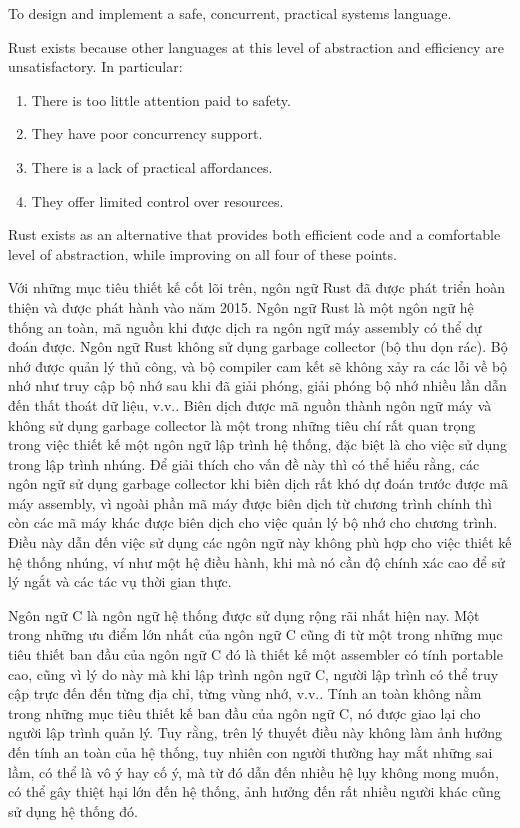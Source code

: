 To design and implement a safe, concurrent, practical systems language.

Rust exists because other languages at this level of abstraction and efficiency are unsatisfactory. In particular:

\begin{enumerate}
\item There is too little attention paid to safety.
\item They have poor concurrency support.
\item There is a lack of practical affordances.
\item They offer limited control over resources.
\end{enumerate}

Rust exists as an alternative that provides both efficient code and a comfortable level of abstraction, while improving on all four of these points.

\bigskip

Với những mục tiêu thiết kế cốt lõi trên, ngôn ngữ Rust đã được phát triển hoàn thiện và được phát hành vào năm 2015.
Ngôn ngữ Rust là một ngôn ngữ hệ thống an toàn, mã nguồn khi được dịch ra ngôn ngữ máy assembly có thể dự đoán được.
Ngôn ngữ Rust không sử dụng garbage collector (bộ thu dọn rác). Bộ nhớ được quản lý thủ công, và bộ compiler cam kết sẽ không xảy ra các lỗi về bộ nhớ như truy cập bộ nhớ sau khi đã giải phóng, giải phóng bộ nhớ nhiều lần dẫn đến thất thoát dữ liệu, v.v..
Biên dịch được mã nguồn thành ngôn ngữ máy và không sử dụng garbage collector là một trong những tiêu chí rất quan trọng trong việc thiết kế một ngôn ngữ lập trình hệ thống, đặc biệt là cho việc sử dụng trong lập trình nhúng.
Để giải thích cho vấn đề này thì có thể hiểu rằng, các ngôn ngữ sử dụng garbage collector khi biên dịch rất khó dự đoán trước được mã máy assembly, vì ngoài phần mã máy được biên dịch từ chương trình chính thì còn các mã máy khác được biên dịch cho việc quản lý bộ nhớ cho chương trình.
Điều này dẫn đến việc sử dụng các ngôn ngữ này không phù hợp cho việc thiết kế hệ thống nhúng, ví như một hệ điều hành, khi mà nó cần độ chính xác cao để sử lý ngắt và các tác vụ thời gian thực.

Ngôn ngữ C là ngôn ngữ hệ thống được sử dụng rộng rãi nhất hiện nay. Một trong những ưu điểm lớn nhất của ngôn ngữ C cũng đi từ một trong những mục tiêu thiết ban đầu của ngôn ngữ C đó là thiết kế một assembler có tính portable cao, cũng vì lý do này mà khi lập trình ngôn ngữ C, người lập trình có thể truy cập trực đến đến từng địa chỉ, từng vùng nhớ, v.v.. Tính an toàn không nằm trong những mục tiêu thiết kế ban đầu của ngôn ngữ C, nó được giao lại cho người lập trình quản lý. Tuy rằng, trên lý thuyết điều này không làm ảnh hưởng đến tính an toàn của hệ thống, tuy nhiên con người thường hay mắt những sai lầm, có thể là vô ý hay cố ý, mà từ đó dẫn đến nhiều hệ lụy không mong muốn, có thể gây thiệt hại lớn đến hệ thống, ảnh hưởng đến rất nhiều người khác cũng sử dụng hệ thống đó.

